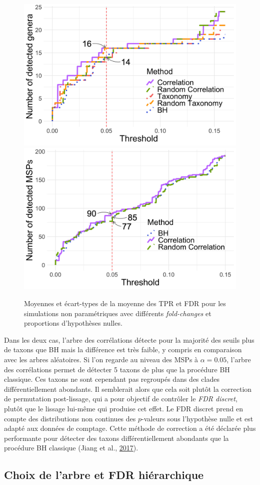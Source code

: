 \documentclass[12pt,a4paper]{reedthesis}
\theoremstyle{definition}
\theoremstyle{definition}
\theoremstyle{definition}
\theoremstyle{remark}
\begin{document}
\begin{figure}[!b]

{\centering \includegraphics[width=0.4\linewidth]{img/zeller_detect_genus} \includegraphics[width=0.4\linewidth]{img/zeller_detect_msp} 

}

\caption{Moyennes et écart-types de la moyenne des TPR et FDR pour les simulations non paramétriques avec différents \emph{fold-changes} et proportions d'hypothèses nulles.}\label{fig:zellerdetected}
\end{figure}
Dans les deux cas, l'arbre des corrélations détecte pour la majorité des seuils plus de taxons que BH mais la différence est très faible, y compris en comparaison avec les arbres aléatoires. Si l'on regarde au niveau des MSPs à \(\alpha = 0.05\), l'arbre des corrélations permet de détecter 5 taxons de plus que la procédure BH classique. Ces taxons ne sont cependant pas regroupés dans des clades différentiellement abondants. Il semblerait alors que cela soit plutôt la correction de permutation post-lissage, qui a pour objectif de contrôler le \emph{FDR discret}, plutôt que le lissage lui-même qui produise cet effet. Le FDR discret prend en compte des distributions non continues des \(p\)-valeurs sous l'hypothèse nulle et est adapté aux données de comptage. Cette méthode de correction a été déclarée plus performante pour détecter des taxons différentiellement abondants que la procédure BH classique (Jiang et al., \protect\hyperlink{ref-jiang2017discrete}{2017}).

\hypertarget{choix-de-larbre-et-fdr-hiuxe9rarchique}{%
\subsection{Choix de l'arbre et FDR hiérarchique}\label{choix-de-larbre-et-fdr-hiuxe9rarchique}}
\end{document}
